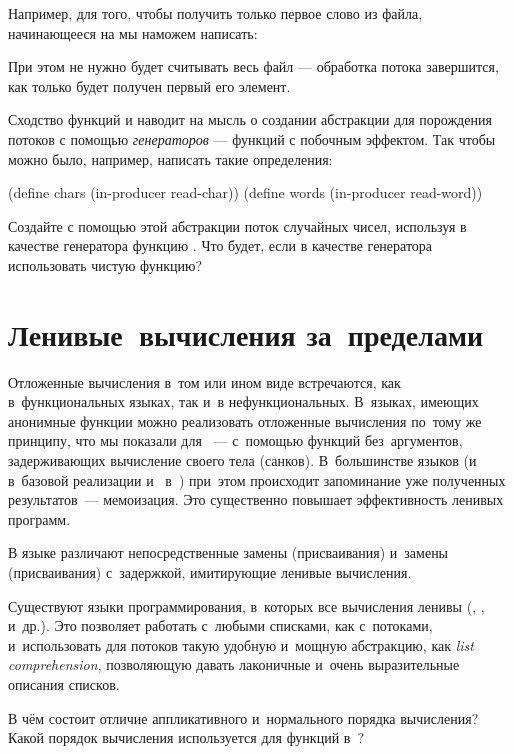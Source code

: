 {Например, для того, чтобы получить только первое слово из файла, начинающееся на  мы наможем написать:

\noindent
При этом не нужно будет считывать весь файл --- обработка потока завершится, как только будет получен первый его элемент.

\begin{Assignment}
Сходство функций  и  наводит на мысль о создании абстракции для порождения потоков с помощью \emph{генераторов} --- функций с побочным эффектом. Так чтобы можно было, например, написать такие определения:
\begin{SchemeCode}
(define chars (in-producer read-char))
(define words (in-producer read-word))
\end{SchemeCode}
Создайте с помощью этой абстракции поток случайных чисел, используя в качестве генератора функцию . Что будет, если в качестве генератора использовать чистую функцию?
\end{Assignment}


\section{Ленивые~вычисления за~пределами~\Scheme}%
Отложенные вычисления в~том или ином виде встречаются, как в~функциональных языках, так и~в нефункциональных. В~языках, имеющих анонимные функции можно реализовать отложенные вычисления по~тому же принципу, что мы показали для \Scheme~--- с~помощью функций без~аргументов, задерживающих вычисление своего тела (санков). В~большинстве языков (и в~базовой реализации  и~\s{!} в~\Scheme) при~этом происходит запоминание уже полученных результатов~--- мемоизация. Это существенно повышает эффективность ленивых программ.

В языке  различают непосредственные замены (присваивания) и~замены (присваивания) с~задержкой, имитирующие ленивые вычисления.

Существуют языки программирования, в~которых все вычисления ленивы (, ,  и~др.). Это позволяет работать с~любыми списками, как с~потоками, и~использовать для потоков такую удобную и~мощную абстракцию, как \emph{list comprehension}, позволяющую давать лаконичные и~очень выразительные описания списков.

\begin{Queeze}

 \item В чём состоит отличие аппликативного и~нормального порядка вычисления? Какой порядок вычисления используется для функций в~\Scheme?


\end{Queeze}}

